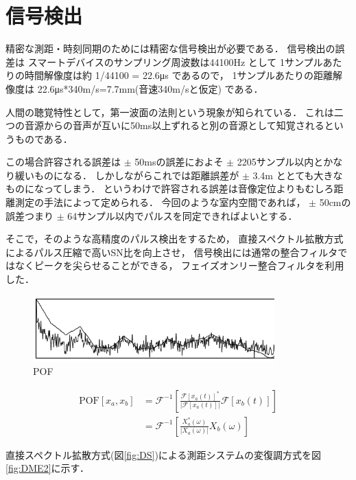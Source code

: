 
\section{信号検出}

精密な測距・時刻同期のためには精密な信号検出が必要である．
信号検出の誤差は
スマートデバイスのサンプリング周波数は44100Hz
として
1サンプルあたりの時間解像度は約 1/44100 = 22.6μs
であるので，
1サンプルあたりの距離解像度は 22.6μs*340m/s=7.7mm(音速340m/sと仮定)
である．

人間の聴覚特性として，第一波面の法則という現象が知られている\cite{Haas}．
これは二つの音源からの音声が互いに50ms以上ずれると別の音源として知覚されるというものである．

この場合許容される誤差は
$\pm$ 50msの誤差におよそ $\pm$ 2205サンプル以内とかなり緩いものになる．
しかしながらこれでは距離誤差が $\pm$ 3.4m ととても大きなものになってしまう．
というわけで許容される誤差は音像定位よりもむしろ距離測定の手法によって定められる．
今回のような室内空間であれば，
$\pm$ 50cmの誤差つまり $\pm$ 64サンプル以内でパルスを同定できればよいとする．

そこで，そのような高精度のパルス検出をするため，
直接スペクトル拡散方式によるパルス圧縮で高いSN比を向上させ，
信号検出には通常の整合フィルタではなくピークを尖らせることができる，
フェイズオンリー整合フィルタ\cite{pof}を利用した．

\begin{figure}[p]\centering
  \hspace{-2mm}\includegraphics[clip,width=1.1\hsize]{img/POF.png}
  \caption{POF}\label{fig:POF}
\end{figure}

$$
\begin{aligned}
\mathrm{POF}[x_a, x_b]
&= \mathcal{F}^{-1}\left[\frac{\mathcal{F}\left[x_a(t)\right]^*}{|\mathcal{F}\left[x_a(t)\right]|}\mathcal{F}\left[x_b(t)\right]\right] \\
&= \mathcal{F}^{-1}\left[\frac{X_a^*(\omega)}{|X_a(\omega)|}X_b(\omega)\right]
\end{aligned}
$$


直接スペクトル拡散方式(図\ref{fig:DS})による測距システムの変復調方式を図\ref{fig:DME2}に示す．

